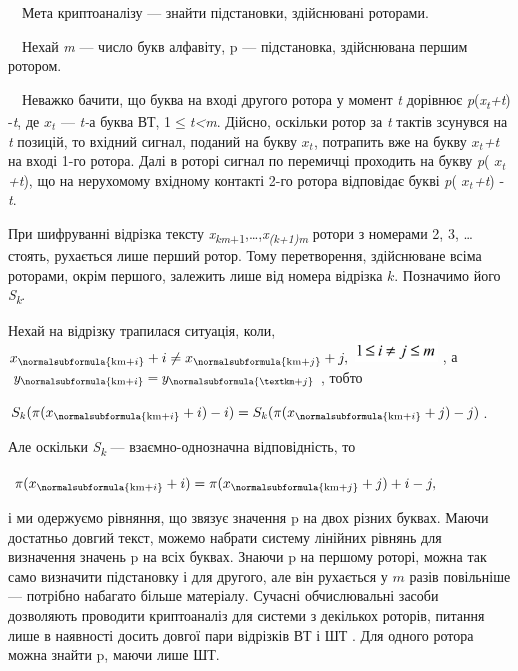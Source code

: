 \ \ Мета криптоаналізу --- знайти підстановки, здійснювані роторами.

\ \ Нехай \textit{m} --- число букв алфавіту, \textgreek{p --- }підстановка,
здійснювана першим ротором.

\ \ Неважко бачити, що буква на вході другого ротора у момент \textit{t}
дорівнює
\textit{\textgreek{p}}(\textit{x}\textit{\textsubscript{t}}\textit{+}\textit{t})
-\textit{t}, де   $x_t$ --- \textit{t}\textit{{}-}а\textit{ }буква ВТ,
1$\leq$\textit{t}\textit{\textless}\textit{m}. Дійсно, оскільки ротор за
\textit{t}\textit{ }тактів зсунувся на \textit{t}\textit{ }позицій, то вхідний
сигнал, поданий на букву $x_t$, потрапить вже на букву 
$x_t$\textit{+t }на вході 1-го ротора. Далі в роторі сигнал по перемичці
проходить на букву \textit{\textgreek{p}}( $x_t$\textit{+}\textit{t}), що
на нерухомому вхідному контакті 2-го ротора відповідає букві
\textit{\textgreek{p}}( $x_t$\textit{+}\textit{t}) -\textit{t}. 

При шифруванні відрізка тексту
\textit{x}\textit{\textsubscript{km}}\textsubscript{+1},…,\textit{x}\textit{\textsubscript{(}}\textit{\textsubscript{k}}\textit{\textsubscript{+1)}}\textit{\textsubscript{m}}
ротори з номерами  2, 3, … стоять, рухається лише перший ротор. Тому
перетворення, здійснюване всіма роторами, окрім першого, залежить лише від
номера відрізка  $k$. Позначимо його \textit{S}\textit{\textsubscript{k}}.

Нехай на відрізку трапилася ситуація, коли, 
${x_{\normalsubformula{\text{km}+i}}+i\neq
x_{\normalsubformula{\text{km}+j}}+j,}$ 
\includegraphics[width=0.861in,height=0.222in]{crypt-img/crypt-img80.png} , а 
$y_{\normalsubformula{\text{km}+i}}=y_{\normalsubformula{\textkm+j}}$,
тобто

{\centering
 ${S_{k}(\pi (x_{\normalsubformula{\text{km}+i}}+i)-i)=S_{k}(\pi
(x_{\normalsubformula{\text{km}+i}}+j)-j)}$.
\par}

Але оскільки \textit{S}\textit{\textsubscript{k}} --- взаємно{}-однозначна
відповідність, то

{\centering  $ $ ${\pi (x_{\normalsubformula{\text{km}+i}}+i)=\pi
(x_{\normalsubformula{\text{km}+j}}+j)+i-j,}$\par}

і ми одержуємо рівняння, що зв{\textquotesingle}язує значення  \textgreek{p }на
двох різних буквах. Маючи достатньо довгий текст, можемо набрати систему
лінійних рівнянь для визначення значень \textgreek{p }на всіх буквах. Знаючи
\textgreek{p }на першому роторі, можна так само визначити підстановку і для
другого, але він рухається у  $m$ разів повільніше --- потрібно набагато більше
матеріалу. Сучасні обчислювальні засоби дозволяють проводити криптоаналіз для
системи з декількох роторів, питання лише в наявності досить довгої пари
відрізків ВТ і ШТ . Для одного ротора можна знайти \textgreek{p, }маючи лише
ШТ.

